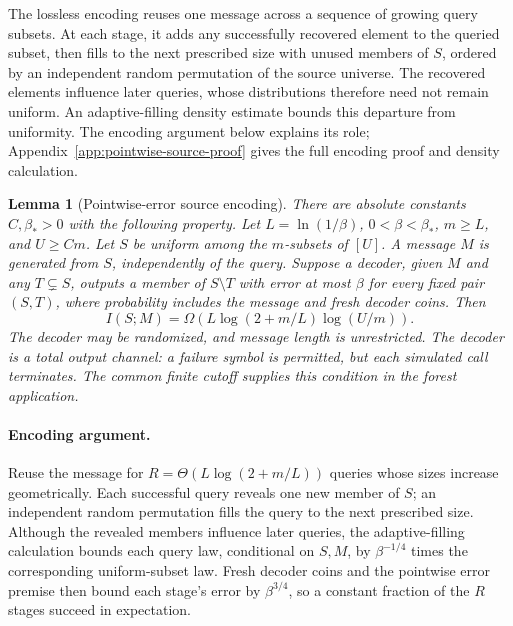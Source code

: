 \documentclass[11pt,letterpaper]{article}
\newtheorem{lemma}[theorem]{Lemma}
\numberwithin{equation}{section}
\begin{document}
The lossless encoding reuses one message across a sequence of growing query subsets.
At each stage, it adds any successfully recovered element to the queried subset, then fills to the next prescribed size with unused members of $S$, ordered by an independent random permutation of the source universe.
The recovered elements influence later queries, whose distributions therefore need not remain uniform.
An adaptive-filling density estimate bounds this departure from uniformity.
The encoding argument below explains its role; Appendix~\ref{app:pointwise-source-proof} gives the full encoding proof and density calculation.

\begin{lemma}[Pointwise-error source encoding]
\label{lem:pointwise-source}
There are absolute constants $C,\beta_*>0$ with the following property.
Let $L=\ln(1/\beta)$, $0<\beta<\beta_*$, $m\ge L$, and $U\ge Cm$.
Let $S$ be uniform among the $m$-subsets of $[U]$.
A message $M$ is generated from $S$, independently of the query.
Suppose a decoder, given $M$ and any $T\subsetneq S$, outputs a member of $S\setminus T$ with error at most $\beta$ for every fixed pair $(S,T)$, where probability includes the message and fresh decoder coins.
Then
\begin{equation}
I(S;M)=\Omega\!\left(
 L\log(2+m/L)\log(U/m)\right).
 \label{eq:pe1}
\end{equation}
The decoder may be randomized, and message length is unrestricted.
The decoder is a total output channel: a failure symbol is permitted, but each simulated call terminates.
The common finite cutoff supplies this condition in the forest application.
\end{lemma}

\paragraph{Encoding argument.}
Reuse the message for $R=\Theta(L\log(2+m/L))$ queries whose sizes increase geometrically.
Each successful query reveals one new member of $S$; an independent random permutation fills the query to the next prescribed size.
Although the revealed members influence later queries, the adaptive-filling calculation bounds each query law, conditional on $S,M$, by $\beta^{-1/4}$ times the corresponding uniform-subset law.
Fresh decoder coins and the pointwise error premise then bound each stage's error by $\beta^{3/4}$, so a constant fraction of the $R$ stages succeed in expectation.
\end{document}
